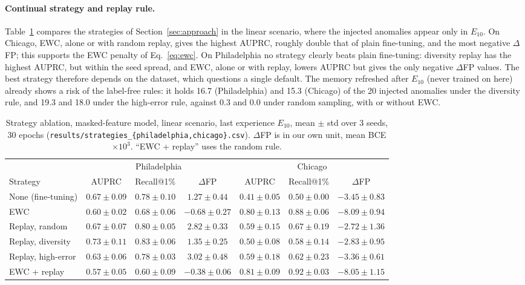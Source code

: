 \documentclass{article} %
\begin{document}
\paragraph{Continual strategy and replay rule.}
Table~\ref{tab:abl-strategies} compares the strategies of Section~\ref{sec:approach}
in the linear scenario, where the injected anomalies appear only in $E_{10}$. On
Chicago, EWC, alone or with random replay, gives the highest AUPRC, roughly
double that of plain fine-tuning, and the most negative $\Delta$FP; this supports
the EWC penalty of Eq.~\eqref{eq:ewc}. On Philadelphia no strategy clearly beats
plain fine-tuning: diversity replay has the highest AUPRC, but within the seed
spread, and EWC, alone or with replay, lowers AUPRC but gives the only negative
$\Delta$FP values.
The best strategy therefore depends on the dataset, which questions a single
default. The memory refreshed after $E_{10}$ (never trained on here) already
shows a risk of the label-free rules: it holds 16.7 (Philadelphia) and 15.3
(Chicago) of the 20 injected anomalies under the diversity rule, and 19.3 and
18.0 under the high-error rule, against 0.3 and 0.0 under random sampling, with
or without EWC.

\begin{table}[t]
\centering\small
\setlength{\tabcolsep}{4pt}
\caption{Strategy ablation, masked-feature model, linear scenario, last
experience $E_{10}$, mean $\pm$ std over 3 seeds, 30 epochs
(\texttt{results/strategies\_\{philadelphia,chicago\}.csv}). $\Delta$FP is in
our own unit, mean BCE $\times10^{3}$. ``EWC + replay'' uses the random rule.}
\label{tab:abl-strategies}
\begin{tabular}{lcccccc}
\toprule
 & \multicolumn{3}{c}{Philadelphia} & \multicolumn{3}{c}{Chicago} \\
\cmidrule(lr){2-4}\cmidrule(lr){5-7}
Strategy & AUPRC & Recall@1\% & $\Delta$FP & AUPRC & Recall@1\% & $\Delta$FP \\
\midrule
None (fine-tuning) & $0.67{\pm}0.09$ & $0.78{\pm}0.10$ & $1.27{\pm}0.44$ & $0.41{\pm}0.05$ & $0.50{\pm}0.00$ & $-3.45{\pm}0.83$ \\
EWC & $0.60{\pm}0.02$ & $0.68{\pm}0.06$ & $-0.68{\pm}0.27$ & $0.80{\pm}0.13$ & $0.88{\pm}0.06$ & $-8.09{\pm}0.94$ \\
Replay, random & $0.67{\pm}0.07$ & $0.80{\pm}0.05$ & $2.82{\pm}0.33$ & $0.59{\pm}0.15$ & $0.67{\pm}0.19$ & $-2.72{\pm}1.36$ \\
Replay, diversity & $0.73{\pm}0.11$ & $0.83{\pm}0.06$ & $1.35{\pm}0.25$ & $0.50{\pm}0.08$ & $0.58{\pm}0.14$ & $-2.83{\pm}0.95$ \\
Replay, high-error & $0.63{\pm}0.06$ & $0.78{\pm}0.03$ & $3.02{\pm}0.48$ & $0.59{\pm}0.18$ & $0.62{\pm}0.23$ & $-3.36{\pm}0.61$ \\
EWC + replay & $0.57{\pm}0.05$ & $0.60{\pm}0.09$ & $-0.38{\pm}0.06$ & $0.81{\pm}0.09$ & $0.92{\pm}0.03$ & $-8.05{\pm}1.15$ \\
\bottomrule
\end{tabular}
\end{table}
\end{document}
